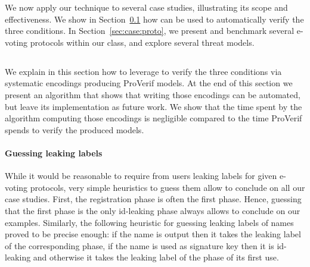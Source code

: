 

We now apply our technique to several case studies, illustrating its
scope and effectiveness.
We show in Section~\ref{sec:case:verif} how \proverif can be used to automatically verify the three conditions.
In Section~\ref{sec:case:proto}, we present and benchmark several
e-voting protocols within our class, and explore several threat models.

\subsection{}
\label{sec:case:verif}
We explain in this section how to leverage \proverif to
verify the three conditions via systematic encodings producing ProVerif models.
At the end of this section we present an algorithm that shows that
writing those encodings can be automated, but leave its implementation
as future work. 
We show that the time spent by the algorithm computing those encodings is negligible compared
to the time ProVerif spends to verify the produced models.

\paragraph{\textbf{Guessing leaking labels}}
While it would be reasonable to require from users leaking labels for given e-voting protocols,
very simple heuristics to guess them allow to conclude on all our case studies.
First, the registration phase is often the first phase. Hence, guessing that the first phase is the only
id-leaking phase always allows to conclude on our examples.
Similarly, the following heuristic for guessing leaking labels of names proved to be precise enough:
if the name is output then it takes the leaking label of the corresponding phase,
if the name is used as signature key then it is id-leaking and
otherwise it takes the leaking label of the phase of its first use. 

